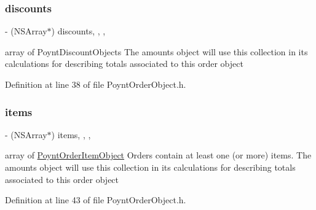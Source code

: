 \hypertarget{interface_poynt_order_object_a203259381417b0a34916ce3f864161c2}{}\label{interface_poynt_order_object_a203259381417b0a34916ce3f864161c2} 
\subsubsection{\texorpdfstring{discounts}{discounts}}
{\footnotesize\ttfamily -\/ (N\+S\+Array$\ast$) discounts\hspace{0.3cm}{\ttfamily [read]}, {\ttfamily [write]}, {\ttfamily [nonatomic]}, {\ttfamily [strong]}}



array of Poynt\+Discount\+Objects  The amounts object will use this collection in its calculations for describing totals associated to this order object 



Definition at line 38 of file Poynt\+Order\+Object.\+h.

\hypertarget{interface_poynt_order_object_a79b667618eb44106221f198156b54dd2}{}\label{interface_poynt_order_object_a79b667618eb44106221f198156b54dd2} 
\subsubsection{\texorpdfstring{items}{items}}
{\footnotesize\ttfamily -\/ (N\+S\+Array$\ast$) items\hspace{0.3cm}{\ttfamily [read]}, {\ttfamily [write]}, {\ttfamily [nonatomic]}, {\ttfamily [strong]}}



array of \hyperlink{interface_poynt_order_item_object}{Poynt\+Order\+Item\+Object}  Orders contain at least one (or more) items. The amounts object will use this collection in its calculations for describing totals associated to this order object 



Definition at line 43 of file Poynt\+Order\+Object.\+h.

\hypertarget{interface_poynt_order_object_a940861134b75ee3d5167d791e5422afe}{}\label{interface_poynt_order_object_a940861134b75ee3d5167d791e5422afe} 
